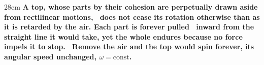 \documentclass[border=4pt]{standalone}
\begin{document}
\begin{varwidth}{28em}
\large\bfseries
A top, whose parts by their cohesion are perpetually drawn aside from rectilinear motions, \     does not cease its rotation otherwise than as it is retarded by the air. Each part is forever pulled \     inward from the straight line it would take, yet the whole endures because no force impels it to stop. \     Remove the air and the top would spin forever, its angular speed unchanged, $\omega = \text{const}$.
\end{varwidth}
\end{document}
